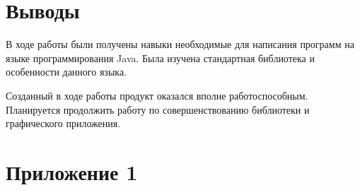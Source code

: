 \section{Выводы}
В ходе работы были получены навыки необходимые для написания программ на языке программирования Java. Была изучена стандартная библиотека и особенности данного языка.

Созданный в ходе работы продукт оказался вполне работоспособным. Планируется продолжить работу по совершенствованию библиотеки и графического приложения. 
\section{Приложение 1}
\label{sec:listings}

\label{listing:Galaxy} 

\parindent=0.6cm


\label{listing:Planet} 

\parindent=0.6cm


\label{listing:Position} 

\parindent=0.6cm


\label{listing:Building} 

\parindent=0.6cm


\label{listing:BuildingType} 

\parindent=0.6cm


\label{listing:BuildingDepartment} 

\parindent=0.6cm


\label{listing:Research} 

\parindent=0.6cm


\label{listing:ResearchType} 

\parindent=0.6cm


